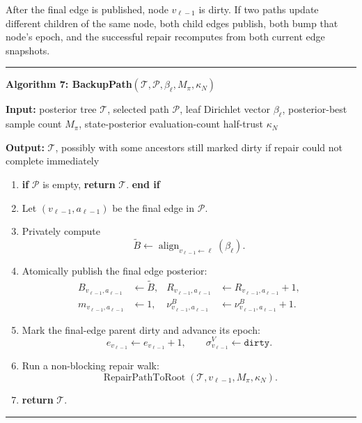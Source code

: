 \documentclass[11pt]{article}
\newcommand{\Tree}{\mathcal{T}}
\newcommand{\Path}{\mathcal{P}}
\newcommand{\Align}{\operatorname{align}}
\newcommand{\RepairPathToRoot}{\operatorname{RepairPathToRoot}}
\newenvironment{algorithmblock}[1]
{
  \par\medskip
  \noindent\hrule\par\smallskip
  \noindent\textbf{#1}
  \par\smallskip
}
{
  \par\smallskip\noindent\hrule\par\medskip
}
\newcommand{\Input}{\textbf{Input: }}
\newcommand{\Output}{\textbf{Output: }}
\newcommand{\Return}{\textbf{return }}
\newcommand{\If}{\textbf{if }}
\newcommand{\EndIf}{\textbf{end if}}
\begin{document}
After the final edge is published, node \(v_{\ell-1}\) is dirty. If two paths
update different children of the same node, both child edges publish, both bump
that node's epoch, and the successful repair recomputes from both current edge
snapshots.

\begin{algorithmblock}{Algorithm 7: BackupPath\((\Tree,\Path,\beta_\ell,M_\pi,\kappa_N)\)}

\Input posterior tree \(\Tree\), selected path \(\Path\), leaf Dirichlet vector \(\beta_\ell\), posterior-best sample count \(M_\pi\), state-posterior evaluation-count half-trust \(\kappa_N\)

\Output \(\Tree\), possibly with some ancestors still marked dirty if repair could not complete immediately

\begin{enumerate}[leftmargin=2em]
  \item \If \(\Path\) is empty, \Return \(\Tree\). \EndIf

  \item Let \((v_{\ell-1},a_{\ell-1})\) be the final edge in \(\Path\).

  \item Privately compute
  \[
  \tilde B
  \gets
  \Align_{v_{\ell-1}\leftarrow \ell}(\beta_\ell).
  \]

  \item Atomically publish the final edge posterior:
  \[
  \begin{aligned}
  B_{v_{\ell-1},a_{\ell-1}}&\gets\tilde B,
  &
  R_{v_{\ell-1},a_{\ell-1}}
  &\gets
  R_{v_{\ell-1},a_{\ell-1}}+1,
  \\[2pt]
  m_{v_{\ell-1},a_{\ell-1}}&\gets 1,
  &
  \nu^B_{v_{\ell-1},a_{\ell-1}}
  &\gets
  \nu^B_{v_{\ell-1},a_{\ell-1}}+1.
  \end{aligned}
  \]

  \item Mark the final-edge parent dirty and advance its epoch:
  \[
  e_{v_{\ell-1}}\gets e_{v_{\ell-1}}+1,
  \qquad
  \sigma^V_{v_{\ell-1}}\gets\texttt{dirty}.
  \]

  \item Run a non-blocking repair walk:
  \[
  \RepairPathToRoot(\Tree,v_{\ell-1},M_\pi,\kappa_N).
  \]

  \item \Return \(\Tree\).
\end{enumerate}

\end{algorithmblock}
\end{document}
